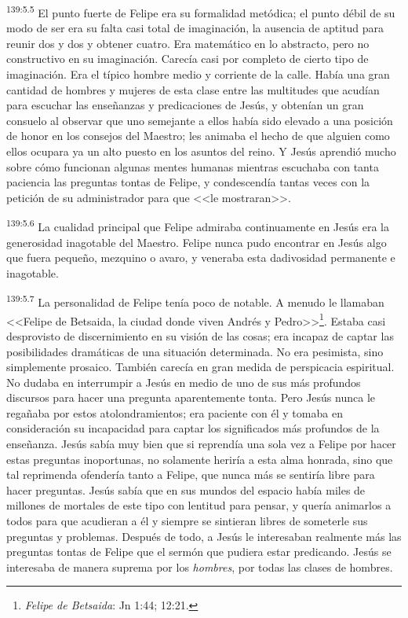 \par 
\textsuperscript{139:5.5} El punto fuerte de Felipe era su formalidad metódica; el punto débil de su modo de ser era su falta casi total de imaginación, la ausencia de aptitud para reunir dos y dos y obtener cuatro. Era matemático en lo abstracto, pero no constructivo en su imaginación. Carecía casi por completo de cierto tipo de imaginación. Era el típico hombre medio y corriente de la calle. Había una gran cantidad de hombres y mujeres de esta clase entre las multitudes que acudían para escuchar las enseñanzas y predicaciones de Jesús, y obtenían un gran consuelo al observar que uno semejante a ellos había sido elevado a una posición de honor en los consejos del Maestro; les animaba el hecho de que alguien como ellos ocupara ya un alto puesto en los asuntos del reino. Y Jesús aprendió mucho sobre cómo funcionan algunas mentes humanas mientras escuchaba con tanta paciencia las preguntas tontas de Felipe, y condescendía tantas veces con la petición de su administrador para que <<le mostraran>>.

\par 
\textsuperscript{139:5.6} La cualidad principal que Felipe admiraba continuamente en Jesús era la generosidad inagotable del Maestro. Felipe nunca pudo encontrar en Jesús algo que fuera pequeño, mezquino o avaro, y veneraba esta dadivosidad permanente e inagotable.

\par 
\textsuperscript{139:5.7} La personalidad de Felipe tenía poco de notable. A menudo le llamaban <<Felipe de Betsaida, la ciudad donde viven Andrés y Pedro>>\footnote{\textit{Felipe de Betsaida}: Jn 1:44; 12:21.}. Estaba casi desprovisto de discernimiento en su visión de las cosas; era incapaz de captar las posibilidades dramáticas de una situación determinada. No era pesimista, sino simplemente prosaico. También carecía en gran medida de perspicacia espiritual. No dudaba en interrumpir a Jesús en medio de uno de sus más profundos discursos para hacer una pregunta aparentemente tonta. Pero Jesús nunca le regañaba por estos atolondramientos; era paciente con él y tomaba en consideración su incapacidad para captar los significados más profundos de la enseñanza. Jesús sabía muy bien que si reprendía una sola vez a Felipe por hacer estas preguntas inoportunas, no solamente heriría a esta alma honrada, sino que tal reprimenda ofendería tanto a Felipe, que nunca más se sentiría libre para hacer preguntas. Jesús sabía que en sus mundos del espacio había miles de millones de mortales de este tipo con lentitud para pensar, y quería animarlos a todos para que acudieran a él y siempre se sintieran libres de someterle sus preguntas y problemas. Después de todo, a Jesús le interesaban realmente más las preguntas tontas de Felipe que el sermón que pudiera estar predicando. Jesús se interesaba de manera suprema por los \textit{hombres}, por todas las clases de hombres.

